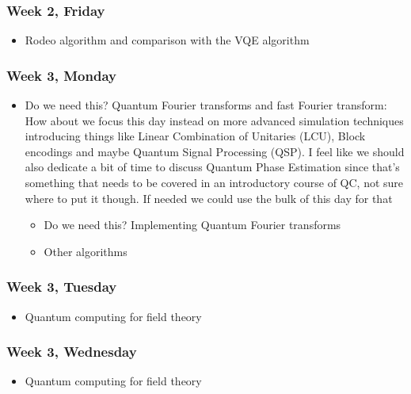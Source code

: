 \documentclass[twocolumn,superscriptaddress,amsmath,amssymb,
aps,floatfix]{revtex4-2}
\newcommand{\ale}[1]{{\color{blue}{\bf Ale}: #1}}
\begin{document}
    \subsubsection{Week 2, Friday}\label{week-2-friday}

\begin{itemize}
\item
  Rodeo algorithm and comparison with the VQE algorithm
\end{itemize}

    \subsubsection{Week 3, Monday}\label{week-3-monday}

\begin{itemize}
\item
  Do we need this? Quantum Fourier transforms and fast Fourier transform\ale{How about we focus this day instead on more advanced simulation techniques introducing things like Linear Combination of Unitaries (LCU), Block encodings and maybe Quantum Signal Processing (QSP). I feel like we should also dedicate a bit of time to discuss Quantum Phase Estimation since that's something that needs to be covered in an introductory course of QC, not sure where to put it though. If needed we could use the bulk of this day for that}
  \begin{itemize}
  \item
    Do we need this? Implementing Quantum Fourier transforms
  \item
    Other algorithms
  \end{itemize}
\end{itemize}

    \subsubsection{Week 3, Tuesday}\label{week-3-tuesday}

\begin{itemize}
\item
  Quantum computing for field theory
\end{itemize}

    \subsubsection{Week 3, Wednesday}\label{week-3-wednesday}

\begin{itemize}
\item
  Quantum computing for field theory
\end{itemize}
\end{document}
